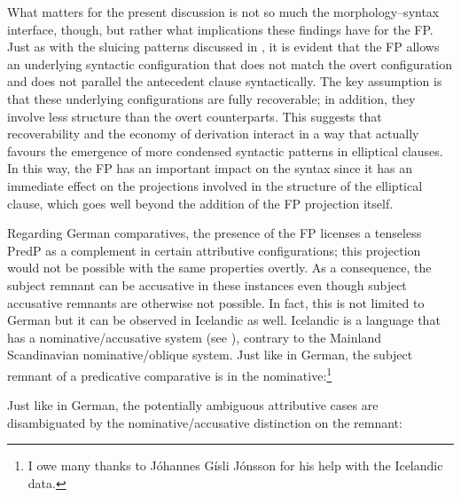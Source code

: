 What matters for the present discussion is not so much the morphology--syntax interface, though, but rather what implications these findings have for the FP. Just as with the sluicing patterns discussed in , it is evident that the FP allows an underlying syntactic configuration that does not match the overt configuration and does not parallel the antecedent clause syntactically. The key assumption is that these underlying configurations are fully recoverable; in addition, they involve less structure than the overt counterparts. This suggests that recoverability and the economy of derivation interact in a way that actually favours the emergence of more condensed syntactic patterns in elliptical clauses. In this way, the FP has an important impact on the syntax since it has an immediate effect on the projections involved in the structure of the elliptical clause, which goes well beyond the addition of the FP projection itself.

\begin{sloppypar}
Regarding German comparatives, the presence of the FP licenses a tenseless PredP as a complement in certain attributive configurations; this projection would not be possible with the same properties overtly. As a consequence, the subject remnant can be accusative in these instances even though subject accusative remnants are otherwise not possible. In fact, this is not limited to German but it can be observed in Icelandic as well. Icelandic is a language that has a nominative/accusative system (see \citealt[115--116]{hroarsdottir2000}), contrary to the Mainland Scandinavian nominative/oblique system. Just like in German, the subject remnant of a predicative comparative is in the nominative:\footnote{I owe many thanks to Jóhannes Gísli Jónsson for his help with the Icelandic data.}
\end{sloppypar}

\ea \label{icelandicpred}
\z
\z

Just like in German, the potentially ambiguous attributive cases are disambiguated by the nominative/accusative distinction on the remnant:

